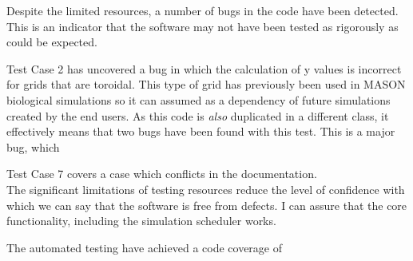 \documentclass[11pt]{article}
\begin{document}
Despite the limited resources, a number of bugs in the code have been detected.
This is an indicator that the software may not have been tested as rigorously as could be expected.

Test Case 2 has uncovered a bug in which the calculation of y values is incorrect for grids that are toroidal.
This type of grid has previously been used in MASON biological simulations\cite{ppsim} so it can assumed as a dependency of future simulations created by the end users.
As this code is \textit{also} duplicated in a different class, it effectively means that two bugs have been found with this test.
This is a major bug, which

Test Case 7 covers a case which conflicts in the documentation.
\\

The significant limitations of testing resources reduce the level of confidence with which we can say that the software is free from defects.
I can assure that the core functionality, including the simulation scheduler works.

The automated testing have achieved a code coverage of 
\\
\end{document}
